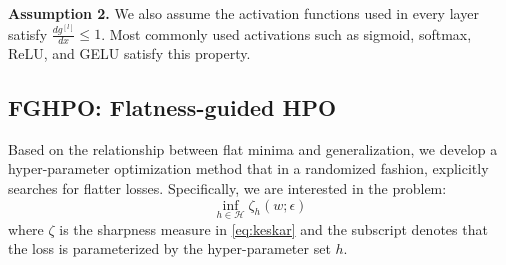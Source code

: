 \documentclass[preprint,12pt]{elsarticle}
\makeatletter
\newcommand{\IT}{FGHPO}
\newtheorem{lemma}{Lemma}
\newtheorem{definition}{Definition}
\DeclarePairedDelimiter\abs{\lvert}{\rvert}%
\DeclarePairedDelimiter\norm{\lVert}{\rVert}%
\let\oldabs\abs
\def\abs{\@ifstar{\oldabs}{\oldabs*}}
\let\oldnorm\norm
\def\norm{\@ifstar{\oldnorm}{\oldnorm*}}
\makeatother
\begin{document}
\textbf{Assumption 2.} We also assume the activation functions used in every layer satisfy $\frac{dg^{[l]}}{dx} \leq 1$. Most commonly used activations such as sigmoid, softmax, ReLU, and GELU satisfy this property.



\subsection{{\IT}: Flatness-guided HPO}
\label{sec:stcvx}

Based on the relationship between flat minima and generalization, we develop a hyper-parameter optimization method that in a randomized fashion, explicitly searches for flatter losses. Specifically, we are interested in the problem:
$$
    \inf\limits_{h \in \mathcal{H}} \zeta_h(w; \epsilon)
$$
where $\zeta$ is the sharpness measure in \eqref{eq:keskar} and the subscript denotes that the loss is parameterized by the hyper-parameter set $h$.


\end{document}
